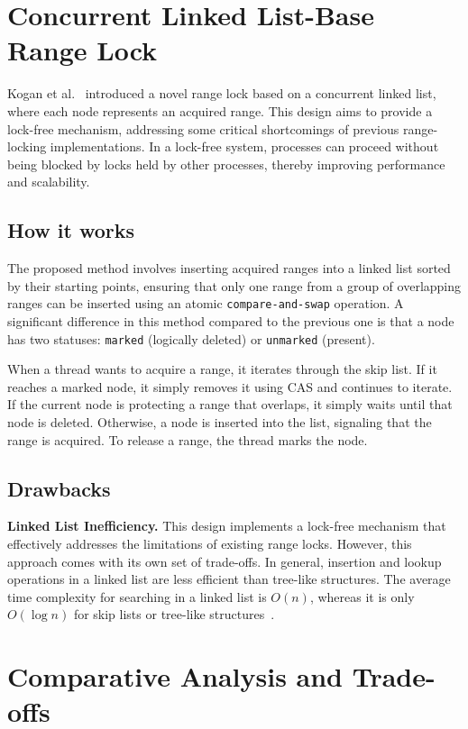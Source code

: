 \section{Concurrent Linked List-Base Range Lock}

Kogan et al.~\parencite{kogan2020scalable} introduced a novel range lock based on a concurrent linked list, where each node represents an acquired range. This design aims to provide a lock-free mechanism, addressing some critical shortcomings of previous range-locking implementations. In a lock-free system, processes can proceed without being blocked by locks held by other processes, thereby improving performance and scalability. 

\subsection*{How it works}

The proposed method involves inserting acquired ranges into a linked list sorted by their starting points, ensuring that only one range from a group of overlapping ranges can be inserted using an atomic \texttt{compare-and-swap} operation. A significant difference in this method compared to the previous one is that a node has two statuses: \texttt{marked} (logically deleted) or \texttt{unmarked} (present). 

When a thread wants to acquire a range, it iterates through the skip list. If it reaches a marked node, it simply removes it using CAS and continues to iterate. If the current node is protecting a range that overlaps, it simply waits until that node is deleted. Otherwise, a node is inserted into the list, signaling that the range is acquired. To release a range, the thread marks the node. 
\subsection*{Drawbacks}

\textbf{Linked List Inefficiency.}
This design implements a lock-free mechanism that effectively addresses the limitations of existing range locks. However, this approach comes with its own set of trade-offs. In general, insertion and lookup operations in a linked list are less efficient than tree-like structures. The average time complexity for searching in a linked list is \( O(n) \), whereas it is only \( O(\log n) \) for skip lists or tree-like structures~\parencite{fomitchev2004lock}.


\section{Comparative Analysis and Trade-offs}

